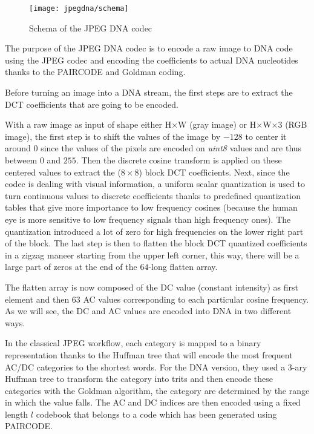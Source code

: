 \begin{figure}
    \centering
    \texttt{[image: jpegdna/schema]}
    \caption{Schema of the JPEG DNA codec}
    \label{fig:jpegdna}
\end{figure}

The purpose of the JPEG DNA codec is to encode a raw image to DNA code using the JPEG codec and encoding the coefficients to actual DNA nucleotides thanks to the PAIRCODE and Goldman coding.

Before turning an image into a DNA stream, the first steps are to extract the DCT coefficients that are going to be encoded. 

With a raw image as input of shape either H$\times$W (gray image) or H$\times$W$\times$3 (RGB image), the first step is to shift the values of the image by $-128$ to center it around $0$ since the values of the pixels are encoded on \textit{uint8} values and are thus betweem $0$ and $255$. Then the discrete cosine transform is applied on these centered values to extract the ($8\times8$) block DCT coefficients. Next, since the codec is dealing with visual information, a uniform scalar quantization is used to turn continuous values to discrete coefficients thanks to predefined quantization tables that give more importance to low frequency cosines (because the human eye is more sensitive to low frequency signals than high frequency ones).  The quantization introduced a lot of zero for high frequencies on the lower right part of the block. The last step is then to flatten the block DCT quantized coefficients in a zigzag maneer starting from the upper left corner, this way, there will be a large part of zeros at the end of the $64$-long flatten array. 

The flatten array is now composed of the DC value (constant intensity) as first element and then 63 AC values corresponding to each particular cosine frequency. As we will see, the DC and AC values are encoded into DNA in two different ways.


In the classical JPEG workflow, each category is mapped to a binary representation thanks to the Huffman tree that will encode the most frequent AC/DC categories to the shortest words. 
For the DNA version, they used a 3-ary Huffman tree to transform the category into trits and then encode these categories with the Goldman algorithm, the category are determined by the range in which the value falls.
The AC and DC indices are then encoded using a fixed length $l$ codebook that belongs to a code which has been generated using PAIRCODE.


